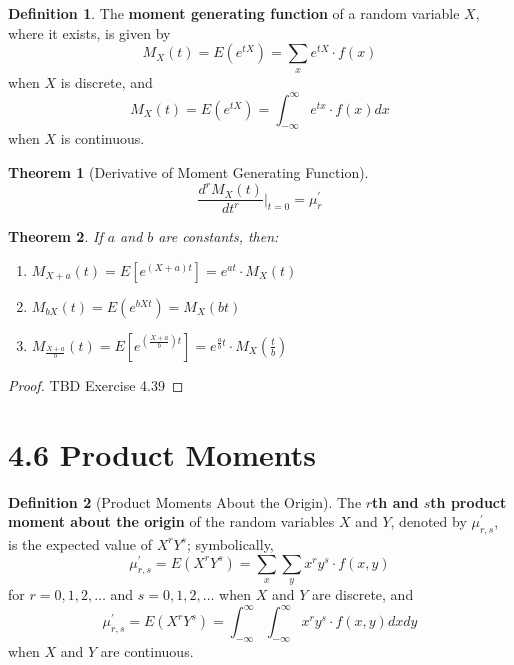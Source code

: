 \documentclass[
10pt,reqno
]{amsart}
\newtheorem{theorem}{Theorem}[section]
\theoremstyle{definition}
\newtheorem{definition}{Definition}[section]
\begin{document}
\begin{definition}
The \textbf{moment generating function} of a random variable \(X\), where it exists, is given by
\[
M_X(t)= E(e^{tX}) = \sum_x e^{tX} \cdot f(x)
\]
when \(X\) is discrete, and 
\[
M_X(t)= E(e^{tX}) = \int_{- \infty}^{\infty}e^{tx} \cdot f(x) dx
\]
when \(X\) is continuous.
\end{definition}

\begin{theorem}[Derivative of Moment Generating Function]
\[
\frac{d^r M_X(t)}{dt^r} \Bigg \vert _{t=0}=\mu_r^{'}
\]
\end{theorem}

\begin{theorem}
If \(a\) and \(b\) are constants, then:
\begin{enumerate}
	\item \( M_{X+a}(t) = E [e^{(X + a)t}] = e^{at} \cdot M_X (t)\)
	\item \( M_{bX}(t) = E (e^{bXt}) = M_X (bt)\)
	\item \( M_{\frac{X+a}{b}}(t) = E [e^{(\frac{X + a}{b})t}] = e^{\frac{a}{b}t} \cdot M_X (\frac{t}{b})\)
\end{enumerate}
\end{theorem}

\begin{proof}
TBD Exercise 4.39
\end{proof}

\section*{4.6 Product Moments}

\begin{definition}[Product Moments About the Origin]
The \textbf{\(r\)th and \(s\)th product moment about the origin} of the random variables \(X\) and \(Y\), denoted by \(\mu^{'}_{r,s}\), is the expected value of \(X^r Y^s\); symbolically,
\[
\mu^{'}_{r,s}= E(X^r Y^s)=\sum_x \sum_y x^r y^s \cdot f(x,y)
\]
for \(r=0,1,2, \ldots \) and \(s=0,1,2,\ldots\) when \(X\) and \(Y\) are discrete, and
\[
\mu^{'}_{r,s}= E(X^r Y^s)=\int_{- \infty}^{\infty} \int_{- \infty}^{\infty} x^r y^s \cdot f(x,y) dx dy
\]
when \(X\) and \(Y\) are continuous.
\end{definition}
\end{document}
